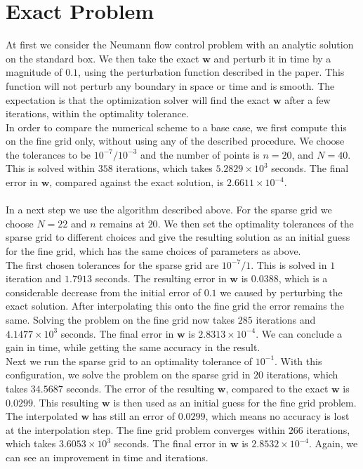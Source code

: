 \documentclass[11pt, a4paper]{article}
\theoremstyle{definition}
\newcommand{\w}{\mathbf{w}}
\begin{document}
\section{Exact Problem}
At first we consider the Neumann flow control problem with an analytic solution on the standard box. We then take the exact $\w$ and perturb it in time by a magnitude of $0.1$, using the perturbation function described in the paper. This function will not perturb any boundary in space or time and is smooth. The expectation is that the optimization solver will find the exact $\w$ after a few iterations, within the optimality tolerance.\\
In order to compare the numerical scheme to a base case, we first compute this on the fine grid only, without using any of the described procedure. We choose the tolerances to be $10^{-7}/10^{-3}$ and the number of points is $n = 20$, and $N = 40$. This is solved within $358$ iterations, which takes $5.2829 \times 10^3$ seconds. The final error in $\w$, compared against the exact solution, is $2.6611 \times 10^{-4}$.   \\
\\
In a next step we use the algorithm described above. For the sparse grid we choose $N = 22$ and $n$ remains at $20$. We then set the optimality tolerances of the sparse grid to different choices and give the resulting solution as an initial guess for the fine grid, which has the same choices of parameters as above.\\
The first chosen tolerances for the sparse grid are $10^{-7}/ 1$.
This is solved in $1$ iteration and $1.7913$ seconds. The resulting error in $\w$ is $0.0388$, which is a considerable decrease from the initial error of $0.1$ we caused by perturbing the exact solution. After interpolating this onto the fine grid the error remains the same. Solving the problem on the fine grid now takes $285$ iterations and $4.1477 \times 10^3$ seconds. The final error in $\w$ is $2.8313 \times 10^{-4}$. We can conclude a gain in time, while getting the same accuracy in the result.
\\
Next we run the sparse grid to an optimality tolerance of $10^{-1}$. With this configuration, we solve the problem on the sparse grid in $20$ iterations, which takes $34.5687$ seconds. The error of the resulting $\w$, compared to the exact $\w$ is $0.0299$. 
This resulting $\w$ is then used as an initial guess for the fine grid problem. The interpolated $\w$ has still an error of $0.0299$, which means no accuracy is lost at the interpolation step. The fine grid problem converges within $266$ iterations, which takes $3.6053 \times 10^3$ seconds. The final error in $\w$ is $2.8532 \times 10^{-4}$. Again, we can see an improvement in time and iterations.\\
\end{document}
